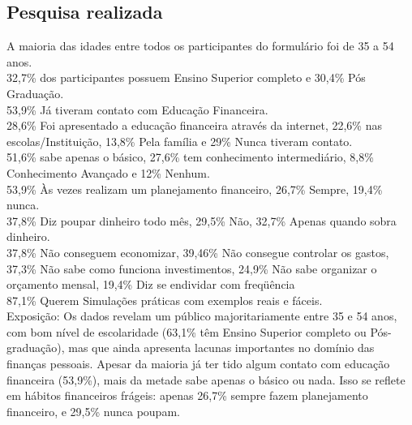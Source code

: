 \documentclass[
	article,			%
	12pt,				%
	oneside,			%
	a4paper,			%
	english,			%
	brazil,				%
	sumario=tradicional
	]{abntex2}
\begin{document}
\newpage
\begin{apendicesenv}

\chapter{Pesquisa realizada}
    A maioria das idades entre todos os participantes do formulário foi de 35 a 54 anos.\\ 
    32,7\%  dos participantes possuem Ensino Superior completo e 30,4\% Pós Graduação. \\
    53,9\%  Já tiveram contato com Educação Financeira. \\
    28,6\%  Foi apresentado a educação financeira através da internet, 22,6\% nas escolas/Instituição, 13,8\% Pela família e 29\% Nunca tiveram contato. \\
    51,6\%  sabe apenas o básico, 27,6\% tem conhecimento intermediário, 8,8\% Conhecimento  Avançado e 12\% Nenhum. \\
    53,9\% Às vezes realizam um planejamento financeiro, 26,7\% Sempre, 19,4\% nunca. \\
    37,8\% Diz poupar dinheiro todo mês, 29,5\% Não, 32,7\% Apenas quando sobra dinheiro. \\
    37,8\% Não conseguem economizar, 39,46\% Não consegue controlar os gastos, 37,3\% Não sabe como funciona investimentos, 24,9\% Não sabe organizar o orçamento mensal,  19,4\% Diz se endividar com freqüência \\
    87,1\% Querem Simulações práticas com exemplos reais e fáceis. \\
    Exposição: 
    Os dados revelam um público majoritariamente entre 35 e 54 anos, com bom nível de  escolaridade (63,1\% têm Ensino Superior completo ou Pós-graduação), mas que ainda apresenta lacunas importantes no domínio das finanças pessoais. Apesar da maioria já ter tido algum contato com educação financeira (53,9\%), mais da metade sabe apenas o básico ou nada. Isso se reflete em hábitos financeiros frágeis: apenas 26,7\% sempre fazem planejamento financeiro, e 29,5\% nunca poupam. 

\end{apendicesenv}
\end{document}
